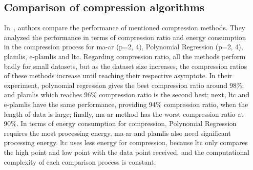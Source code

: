 \subsection{Comparison of compression algorithms}
\label{sec:comparision-lossy}
In~\cite{zordan2014performance}, authors compare the performance of mentioned
compression methods. They analyzed the performance in terms of compression ratio
and energy consumption in the compression process for \acrshort{ma-ar} (p={2,
4}), Polynomial Regression (p={2, 4}), \acrshort{plamlis}, \acrshort{e-plamlis}
and \acrshort{ltc}. Regarding compression ratio, all the methods perform badly
for small datasets, but as the dataset size increases, the compression ratios of
these methods increase until reaching their respective asymptote.
In their experiment, polynomial regression gives the best compression ratio
around 98\%; and \acrshort{plamlis} which reaches 96\% compression ratio is the
second best; next, \acrshort{ltc} and \acrshort{e-plamlis} have the same
performance, providing 94\% compression ratio, when the length of data is large;
finally, \acrshort{ma-ar} method has the worst compression ratio at 90\%. In
terms of energy consumption for compression, Polynomial Regression requires the
most processing energy, \acrshort{ma-ar} and \acrshort{plamlis} also need
significant processing energy. \acrshort{ltc} uses less energy for compression,
because \acrshort{ltc} only compares the high point and low point with the data
point received, and the computational complexity of each comparison process is
constant.
